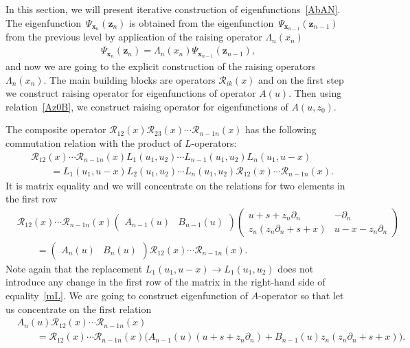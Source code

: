 \documentclass[10pt,a4paper]{amsart}
\numberwithin{equation}{section}
\begin{document}
In this section, we will present iterative construction of
eigenfunctions~\eqref{AbAN}. The eigenfunction~$\Psi_{\bm x_n}(\bm z_n)$
is obtained from the eigenfunction~$\Psi_{\bm x_{n-1}}(\bm z_{n-1})$
from the previous level by application of
the raising operator $\Lambda_n(x_n)$
\begin{align*}
\Psi_{\bm x_n}(\bm z_n) = \Lambda_n(x_n) \Psi_{\bm x_{n-1}}(\bm z_{n-1}) ,
\end{align*}
and now we are going to the explicit construction of
the raising operators $\Lambda_n(x_n)$.
The main building blocks are operators $\mathcal{R}_{ik}( x)$
and on the first step we construct raising operator
for eigenfunctions of operator $A(u)$. Then using relation~\eqref{Az0B},
we construct raising operator for eigenfunctions of $A(u,z_0)$.

The composite operator
$
\mathcal{R}_{12}( x)\mathcal{R}_{23}( x)\cdots
\mathcal{R}_{n-1 n}( x)
$
has the following commutation relation with the
product of $L$-operators:
\begin{align}
& \nonumber
\mathcal{R}_{12}( x)\cdots
\mathcal{R}_{n-1 n}( x)
L_{1}(u_{1},u_{2})\cdots
L_{n-1}(u_{1},u_{2})
L_{n}(u_{1},u-x) \\
& \qquad
= L_{1}(u_{1},u-x)
L_{2}(u_{1},u_{2})\cdots
L_{n}(u_{1},u_{2}) \mathcal{R}_{12}( x)\cdots
\mathcal{R}_{n-1 n}(x) .\label{mL}
\end{align}
It is matrix equality and we will concentrate on
the relations for two elements in the first row
\begin{align*}
&
\mathcal{R}_{12}( x)\cdots
\mathcal{R}_{n-1 n}( x)
\begin{pmatrix}
A_{n-1}(u) & B_{n-1}(u)
\end{pmatrix}
\begin{pmatrix} u+s+z_n \partial_n & -\partial_n\\
z_n(z_n\partial_n + s+x) & u-x-z_n\partial_n
\end{pmatrix} \\
&
\qquad= \begin{pmatrix}
A_{n}(u) & B_{n}(u)
\end{pmatrix}
\mathcal{R}_{12}( x)\cdots
\mathcal{R}_{n-1 n}( x) .
\end{align*}
Note again that the replacement $L_{1}(u_{1},u-x)\to L_{1}(u_{1},u_{2})$ does not introduce any change
in the first row of the matrix in the right-hand side of equality~\eqref{mL}.
We are going to construct eigenfunction of $A$-operator so that
let us concentrate on the first relation
\begin{align*}
&
A_{n}(u) \mathcal{R}_{12}( x)\cdots
\mathcal{R}_{n-1 n}( x) \\
&
\qquad=
\mathcal{R}_{12}( x)\cdots
\mathcal{R}_{n-1 n}( x)
\bigl(A_{n-1}(u) (u+s+z_n \partial_n)
+ B_{n-1}(u) z_n (z_n \partial_n +
s+x)\bigl) .
\end{align*}
\end{document}
